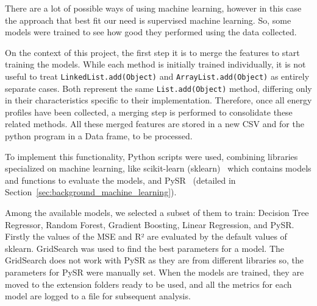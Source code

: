There are a lot of possible ways of using machine learning, however in this case the approach that best fit our need is supervised machine learning. So, some models were trained to see how good they performed using the data collected.

 

On the context of this project, the first step it is to merge the features to start training the models. While each method is initially trained individually, it is not useful to treat \texttt{LinkedList.add(Object)} and \texttt{ArrayList.add(Object)} as entirely separate cases. Both represent the same \texttt{List.add(Object)} method, differing only in their characteristics specific to their implementation. Therefore, once all energy profiles have been collected, a merging step is performed to consolidate these related methods. All these merged features are stored in a new CSV and for the python program in a Data frame, to be processed.

To implement this functionality, Python scripts were used, combining libraries specialized on machine learning, like scikit-learn (sklearn)~\cite{scikit-learn} which contains models and functions to evaluate the models, and PySR~\cite{cranmer2023interpretablemachinelearningscience} (detailed in Section~\ref{sec:background_machine_learning}).

Among the available models, we selected a subset of them to train: Decision Tree Regressor, Random Forest, Gradient Boosting, Linear Regression, and PySR. Firstly the values of the MSE and R² are evaluated by the default values of sklearn. GridSearch was used to find the best parameters for a model. The GridSearch does not work with PySR as they are from different libraries so, the parameters for PySR were manually set. When the models are trained, they are moved to the extension folders ready to be used, and all the metrics for each model are logged to a file for subsequent analysis.


